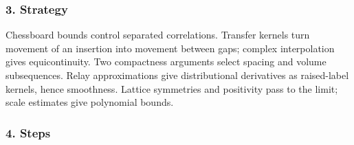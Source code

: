 \documentclass[
  letterpaper,
  11pt]{article}
\begin{document}
\subsubsection{3. Strategy}\label{strategy-19}

Chessboard bounds control separated correlations. Transfer kernels turn
movement of an insertion into movement between gaps; complex
interpolation gives equicontinuity. Two compactness arguments select
spacing and volume subsequences. Relay approximations give
distributional derivatives as raised-label kernels, hence smoothness.
Lattice symmetries and positivity pass to the limit; scale estimates
give polynomial bounds.

\subsubsection{4. Steps}\label{steps-19}
\end{document}
